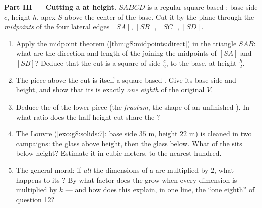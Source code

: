 \begin{problem}
\medskip
\noindent\textbf{Part III --- Cutting a  at  height.}
$SABCD$ is a regular square-based : base side $c$, height
$h$, apex $S$ above the center of the base. Cut it by the plane
through the \emph{midpoints} of the four lateral edges $[SA]$,
$[SB]$, $[SC]$, $[SD]$.
\begin{enumerate}[resume]
  \item Apply the midpoint theorem
        (\cref{thm:g8:midpoints:direct}) in the triangle $SAB$:
        what are the direction and length of the  joining
        the midpoints of $[SA]$ and $[SB]$? Deduce that the cut
        is a square of side $\frac{c}{2}$,  to the base,
        at height $\frac{h}{2}$.
  \item The piece above the cut is itself a square-based .
        Give its base side and height, and show that its 
        is exactly \emph{one eighth} of the original  $V$.
  \item Deduce the  of the lower piece (the \emph{frustum},
        the shape of an unfinished ). In what ratio does
        the half-height cut share the ?
  \item The Louvre  (\cref{exo:g8:solids:7}: base side
        $35$ m, height $22$ m) is cleaned in two campaigns: the
        glass above  height, then the glass below. What
         of the \emph{} sits below  height?
        Estimate it in cubic meters, to the nearest hundred.
  \item The general moral: if \emph{all} the dimensions of a
         are multiplied by $2$, what happens to its
        ? By what factor does the  grow when every
        dimension is multiplied by $k$ --- and how does this
        explain, in one line, the ``one eighth'' of question 12?
\end{enumerate}
\end{problem}
